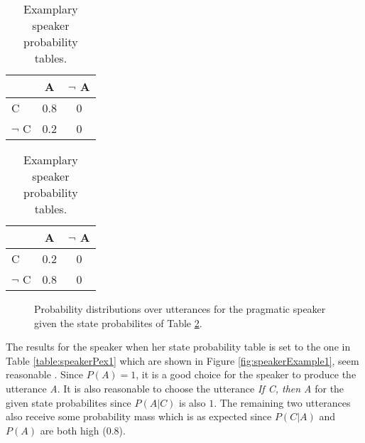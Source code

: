 \begin{table}[ht]
\centering
\begin{tabular}{|l|c|c|}
\hline 
 & A & $\neg$ A \\ \hline 
C & 0.8 & 0 \\
$\neg$ C & 0.2 & 0\\ \hline
 \end{tabular} \qquad
\begin{tabular}{|l|c|c|}
\hline 
 & A & $\neg$ A \\ \hline 
C & 0.2 & 0 \\
$\neg$ C & 0.8 & 0\\ \hline
 \end{tabular}

  \qquad
{}
\caption{Examplary speaker probability tables.}
 \label{table:PspeakerA}
 \end{table}
 
 \begin{figure}[ht]
 \centering
 \qquad
\caption{Probability distributions over utterances for the pragmatic speaker given the state probabilites of Table \ref{table:PspeakerA}.}
\label{fig:speakerExamples12} 
 \end{figure}
 
The results for the speaker when her state probability table is set to the one in Table \ref{table:speakerPex1} which are shown in Figure \ref{fig:speakerExample1},  seem reasonable . Since $P(A)=1$, it is a good choice for the speaker to produce the utterance \textit{A}. It is also reasonable to choose the utterance \textit{If C, then A} for the given state probabilites since $P(A|C)$ is also $1$. The remaining two utterances also receive some probability mass which is as expected since $P(C|A)$ and $P(A)$ are both high ($0.8$).
 

